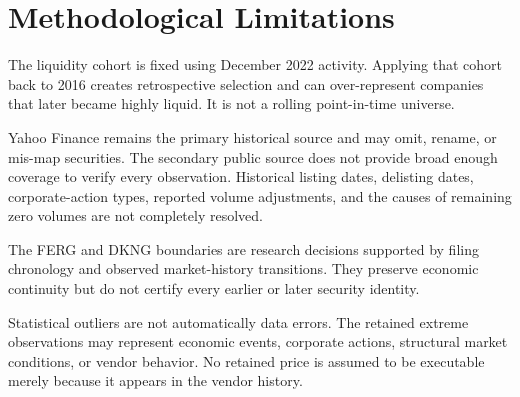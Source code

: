 \section{Methodological Limitations}

The liquidity cohort is fixed using December 2022 activity. Applying that cohort
back to 2016 creates retrospective selection and can over-represent companies
that later became highly liquid. It is not a rolling point-in-time universe.

Yahoo Finance remains the primary historical source and may omit, rename, or
mis-map securities. The secondary public source does not provide broad enough
coverage to verify every observation. Historical listing dates, delisting
dates, corporate-action types, reported volume adjustments, and the causes of
remaining zero volumes are not completely resolved.

The FERG and DKNG boundaries are research decisions supported by filing
chronology and observed market-history transitions. They preserve economic
continuity but do not certify every earlier or later security identity.

Statistical outliers are not automatically data errors. The retained extreme
observations may represent economic events, corporate actions, structural
market conditions, or vendor behavior. No retained price is assumed to be
executable merely because it appears in the vendor history.
